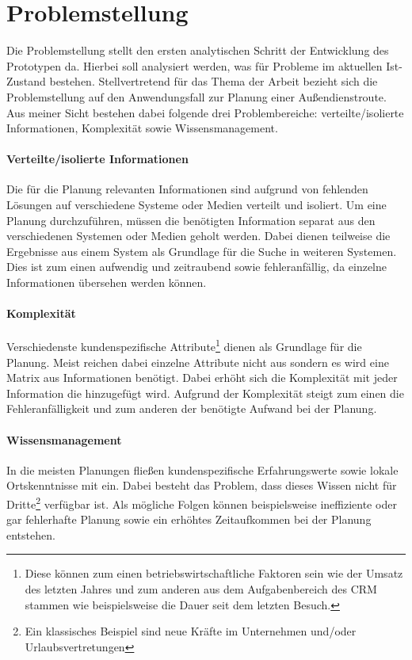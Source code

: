 \documentclass[Bachelorarbeit.tex]{subfiles}
\begin{document}
\section{Problemstellung}
\label{chap:einfuehrung:sec:problemstellung}
Die Problemstellung stellt den ersten analytischen Schritt der Entwicklung des Prototypen da.
Hierbei soll analysiert werden, was für Probleme im aktuellen Ist-Zustand bestehen.
Stellvertretend für das Thema der Arbeit bezieht sich die Problemstellung auf den Anwendungsfall zur Planung einer Außendienstroute.
Aus meiner Sicht bestehen dabei folgende drei Problembereiche: verteilte/isolierte Informationen, Komplexität sowie Wissensmanagement.

\paragraph*{Verteilte/isolierte Informationen}
Die für die Planung relevanten Informationen sind aufgrund von fehlenden Lösungen auf verschiedene Systeme oder Medien verteilt und isoliert. 
Um eine Planung durchzuführen, müssen die benötigten Information separat aus den verschiedenen Systemen oder Medien geholt werden.
Dabei dienen teilweise die Ergebnisse aus einem System als Grundlage für die Suche in weiteren Systemen.
Dies ist zum einen aufwendig und zeitraubend sowie fehleranfällig, da einzelne Informationen übersehen werden können.
\newpage

\paragraph*{Komplexität}
Verschiedenste kundenspezifische Attribute\footnote{
	Diese können zum einen betriebswirtschaftliche Faktoren sein wie der Umsatz des letzten Jahres und zum anderen aus dem Aufgabenbereich des \ac{CRM} stammen wie beispielsweise die Dauer seit dem letzten Besuch.
	} dienen als Grundlage für die Planung.
Meist reichen dabei einzelne Attribute nicht aus sondern es wird eine Matrix aus Informationen benötigt.
Dabei erhöht sich die Komplexität mit jeder Information die hinzugefügt wird.
Aufgrund der Komplexität steigt zum einen die Fehleranfälligkeit und zum anderen der benötigte Aufwand bei der Planung.

\paragraph*{Wissensmanagement}
In die meisten Planungen fließen kundenspezifische Erfahrungswerte sowie lokale Ortskenntnisse mit ein.
Dabei besteht das Problem, dass dieses Wissen nicht für Dritte\footnote{Ein klassisches Beispiel sind neue Kräfte im Unternehmen und/oder Urlaubsvertretungen} verfügbar ist.
Als mögliche Folgen können beispielsweise ineffiziente oder gar fehlerhafte Planung sowie ein erhöhtes Zeitaufkommen bei der Planung entstehen. 
\end{document}
